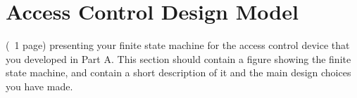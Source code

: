 \section{Access Control Design Model}
\label{sec:background}

(~1 page) presenting your finite state machine for the access control device that you developed in Part A. This section should contain a figure showing the finite state machine, and contain a short description of it and the main design choices you have made.

